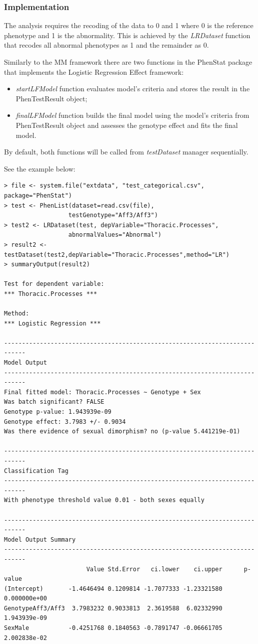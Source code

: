 \documentclass[12pt,a4paper]{article}
\begin{document}
\subsubsection{Implementation}
The analysis requires the recoding of the data to 0 and 1 where 0 is the reference phenotype and 1 is the abnormality. This is achieved by the \textit{LRDataset} function that recodes all abnormal phenotypes as 1 and the remainder as 0. 

Similarly to the MM framework there are two functions in the PhenStat package that implements the Logistic Regression Effect framework:
\begin{itemize}
\item \textit{startLFModel} function evaluates model's criteria and stores the result in the PhenTestResult object;
\item \textit{finalLFModel} function builds the final model using the model's criteria from PhenTestResult object and assesses the genotype effect and fits the final model.
\end{itemize}
By default, both functions will be called from \textit{testDataset} manager sequentially.

See the example below:
\begingroup
\fontsize{8pt}{12pt}\selectfont
\begin{verbatim}
> file <- system.file("extdata", "test_categorical.csv", package="PhenStat")
> test <- PhenList(dataset=read.csv(file),
                  testGenotype="Aff3/Aff3")
> test2 <- LRDataset(test, depVariable="Thoracic.Processes",
				  abnormalValues="Abnormal")
> result2 <-testDataset(test2,depVariable="Thoracic.Processes",method="LR")
> summaryOutput(result2)

Test for dependent variable:
*** Thoracic.Processes ***

Method:
*** Logistic Regression ***

----------------------------------------------------------------------------
Model Output
----------------------------------------------------------------------------
Final fitted model: Thoracic.Processes ~ Genotype + Sex
Was batch significant? FALSE
Genotype p-value: 1.943939e-09
Genotype effect: 3.7983 +/- 0.9034
Was there evidence of sexual dimorphism? no (p-value 5.441219e-01)

----------------------------------------------------------------------------
Classification Tag
----------------------------------------------------------------------------
With phenotype threshold value 0.01 - both sexes equally

----------------------------------------------------------------------------
Model Output Summary
----------------------------------------------------------------------------
                       Value Std.Error   ci.lower    ci.upper      p-value
(Intercept)       -1.4646494 0.1209814 -1.7077333 -1.23321580 0.000000e+00
GenotypeAff3/Aff3  3.7983232 0.9033813  2.3619588  6.02332990 1.943939e-09
SexMale           -0.4251768 0.1840563 -0.7891747 -0.06661705 2.002838e-02
\end{verbatim}
\endgroup
\end{document}
